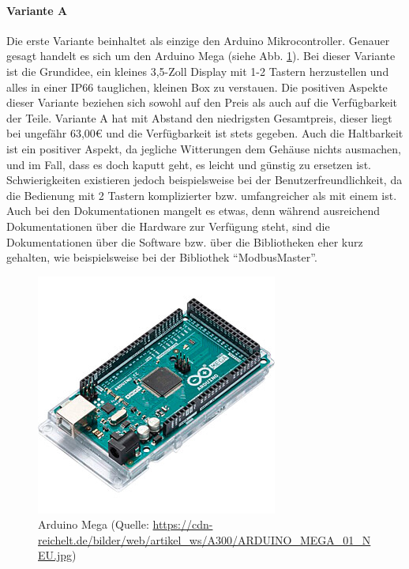 \paragraph{Variante A}
Die erste Variante beinhaltet als einzige den Arduino Mikrocontroller. Genauer gesagt handelt es sich um den Arduino Mega (siehe Abb. \ref{fig:arduino_mega}). Bei dieser Variante ist die Grundidee, ein kleines 3,5-Zoll Display mit 1-2 Tastern herzustellen und alles in einer IP66 tauglichen, kleinen Box zu verstauen. 
Die positiven Aspekte dieser Variante beziehen sich sowohl auf den Preis als auch auf die Verfügbarkeit der Teile. Variante A hat mit Abstand den niedrigsten Gesamtpreis, dieser liegt bei ungefähr 63,00€ und die Verfügbarkeit ist stets gegeben. Auch die Haltbarkeit ist ein positiver Aspekt, da jegliche Witterungen dem Gehäuse nichts ausmachen, und im Fall, dass es doch kaputt geht, es leicht und günstig zu ersetzen ist. Schwierigkeiten existieren jedoch beispielsweise bei der Benutzerfreundlichkeit, da die Bedienung mit 2 Tastern komplizierter bzw. umfangreicher als mit einem ist. Auch bei den Dokumentationen mangelt es etwas, denn während ausreichend Dokumentationen über die Hardware zur Verfügung steht, sind die Dokumentationen über die Software bzw. über die Bibliotheken eher kurz gehalten, wie beispielsweise bei der Bibliothek \enquote{ModbusMaster}.
\begin{figure}[ht]
	\centering
	\includegraphics[width=0.5\linewidth]{Bilder/ARDUINO_MEGA.jpg}
	\caption{Arduino Mega (Quelle: \url{https://cdn-reichelt.de/bilder/web/artikel_ws/A300/ARDUINO_MEGA_01_NEU.jpg})}
	\label{fig:arduino_mega}
\end{figure}
